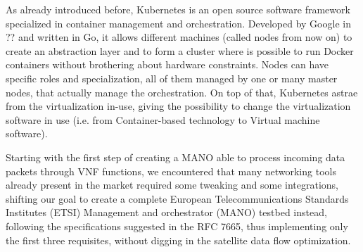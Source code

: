 \documentclass[10pt]{book}
\begin{document}
As already introduced before, Kubernetes is an open source software framework 
specialized in container management and orchestration. Developed by Google in 
?? and written in Go, it allows different 
machines (called nodes from now on) to create an abstraction layer and to form a 
cluster where is possible to run Docker containers without brothering about 
hardware constraints. Nodes can have specific roles and specialization, all of 
them managed by one or many master nodes, that actually manage the 
orchestration.
On top of that, Kubernetes astrae from the virtualization in-use, giving the 
possibility to change the virtualization software in use (i.e. from 
Container-based technology to Virtual machine software).

Starting with the first step of creating a MANO able to process incoming data 
packets through VNF functions, we encountered that many networking tools already 
present in the market required some tweaking and some integrations, shifting our 
goal to create a complete  European Telecommunications Standards Institutes 
(ETSI) Management and orchestrator (MANO) testbed instead, following the 
specifications suggested in the RFC 7665, thus implementing only the first three 
requisites, without digging in the satellite data flow optimization.
\end{document}
